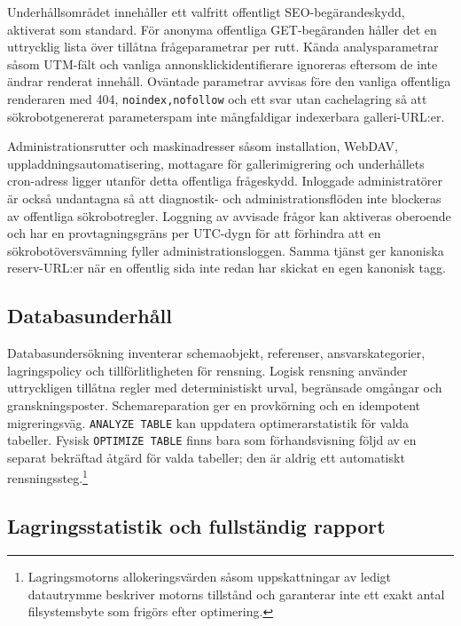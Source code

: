 \documentclass[11pt,a4paper]{article}
\newcommand{\codeword}[1]{\nolinkurl{#1}}
\begin{document}
Underhållsområdet innehåller ett valfritt offentligt SEO-begärandeskydd,
aktiverat som standard. För anonyma offentliga GET-begäranden håller det en
uttrycklig lista över tillåtna frågeparametrar per rutt. Kända analysparametrar
såsom UTM-fält och vanliga annonsklickidentifierare ignoreras eftersom de inte
ändrar renderat innehåll. Oväntade parametrar avvisas före den vanliga
offentliga renderaren med 404, \codeword{noindex,nofollow} och ett svar utan
cachelagring så att sökrobotgenererat parameterspam inte mångfaldigar
indexerbara galleri-URL:er.

Administrationsrutter och maskinadresser såsom installation, WebDAV,
uppladdningsautomatisering, mottagare för gallerimigrering och underhållets
cron-adress ligger utanför detta offentliga frågeskydd. Inloggade
administratörer är också undantagna så att diagnostik- och administrationsflöden
inte blockeras av offentliga sökrobotregler. Loggning av avvisade frågor kan
aktiveras oberoende och har en provtagningsgräns per UTC-dygn för att förhindra
att en sökrobotöversvämning fyller administrationsloggen. Samma tjänst ger
kanoniska reserv-URL:er när en offentlig sida inte redan har skickat en egen
kanonisk tagg.

\subsection{Databasunderhåll}

Databasundersökning inventerar schemaobjekt, referenser, ansvarskategorier,
lagringspolicy och tillförlitligheten för rensning. Logisk rensning använder
uttryckligen tillåtna regler med deterministiskt urval, begränsade omgångar och
granskningsposter. Schemareparation ger en provkörning och en idempotent
migreringsväg. \codeword{ANALYZE TABLE} kan uppdatera optimerarstatistik för
valda tabeller. Fysisk \codeword{OPTIMIZE TABLE} finns bara som förhandsvisning
följd av en separat bekräftad åtgärd för valda tabeller; den är aldrig ett
automatiskt rensningssteg.\footnote{Lagringsmotorns allokeringsvärden såsom
uppskattningar av ledigt datautrymme beskriver motorns tillstånd och garanterar
inte ett exakt antal filsystemsbyte som frigörs efter optimering.}

\subsection{Lagringsstatistik och fullständig rapport}
\end{document}
